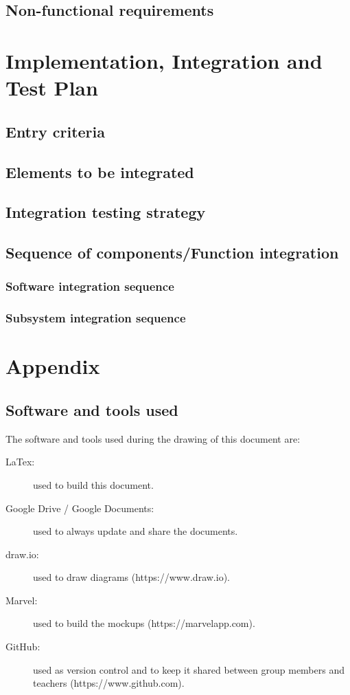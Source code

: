 \documentclass{article}
\begin{document}
	\subsection{Non-functional requirements}


	\section{Implementation, Integration and Test Plan}


	\subsection{Entry criteria}


	\subsection{Elements to be integrated}


	\subsection{Integration testing strategy}


	\subsection{Sequence of components/Function integration}


	\subsubsection{Software integration sequence}


	\subsubsection{Subsystem integration sequence}


	\newpage
	\appendix
	\section{Appendix}


	\subsection{Software and tools used}

	The software and tools used during the drawing of this document are:

	\begin{description}
	\item[LaTex:] used to build this document.
	\item[Google Drive / Google Documents:] used to always update and share the documents.
	\item[draw.io:] used to draw diagrams (https://www.draw.io).
	\item[Marvel:] used to build the mockups (https://marvelapp.com).
	\item[GitHub:] used as version control and to keep it shared between group members and teachers (https://www.github.com).
	\end{description}
	
\end{document}
